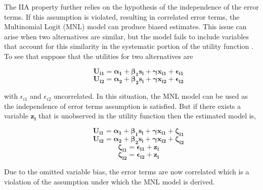\documentclass[a4paper,11pt]{article}
\begin{document}
    The IIA property further relies on the hypothesis of the independence of the error terms. If this assumption is violated, resulting in correlated error terms, the Multinomial Logit (MNL) model can produce biased estimates. This issue can arise when two alternatives are similar, but the model fails to include variables that account for this similarity in the systematic portion of the utility function \cite{Croissant}. To see that suppose that the utilities for two alternatives are

    \begin{equation*}
        \qquad \mathbf{U_{i1} = \alpha_{1} + \beta_{1} s_{i} + \gamma x_{i1} + \epsilon_{i1}}
    \end{equation*}
    \begin{equation*}
      \qquad \mathbf{U_{i2} = \alpha_{2} + \beta_{2} s_{i} + \gamma x_{i2} + \epsilon_{i2}}
    \end{equation*}

    with $\epsilon_{i1}$ and $\epsilon_{i2}$ uncorrelated. In this situation, the MNL model can be used as the independence of error terms assumption is satisfied. But if there exists a variable $\mathbf{z_{i}}$ that is unobserved in the utility function then the estimated model is,

\newpage

    \begin{equation*}
        \qquad \mathbf{U_{i1} = \alpha_{1} + \beta_{1} s_{i} + \gamma x_{i1} + \zeta_{i1}}
    \end{equation*}
    \begin{equation*}
        \qquad \mathbf{U_{i2} = \alpha_{2} + \beta_{2} s_{i} + \gamma x_{i2} + \zeta_{i2}}
    \end{equation*}
    \begin{equation*}
        \qquad \mathbf{\zeta_{i1} = \epsilon_{i1} + z_{i}}
    \end{equation*}
    \begin{equation*}
        \qquad \mathbf{\zeta_{i2} = \epsilon_{i2} + z_{i}}
    \end{equation*}

    Due to the omitted variable bias, the error terms are now correlated which is a violation of the assumption under which the MNL model is derived. \\   
    
\end{document}

